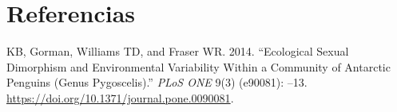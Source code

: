 \documentclass[]{tufte-handout}
\begin{document}
\hypertarget{referencias}{%
\section*{Referencias}\label{referencias}}

\hypertarget{refs}{}
\leavevmode\hypertarget{ref-R-palmerpenguins}{}%
KB, Gorman, Williams TD, and Fraser WR. 2014. ``Ecological Sexual Dimorphism and Environmental Variability Within a Community of Antarctic Penguins (Genus Pygoscelis).'' \emph{PLoS ONE} 9(3) (e90081): --13. \url{https://doi.org/10.1371/journal.pone.0090081}.
\end{document}
